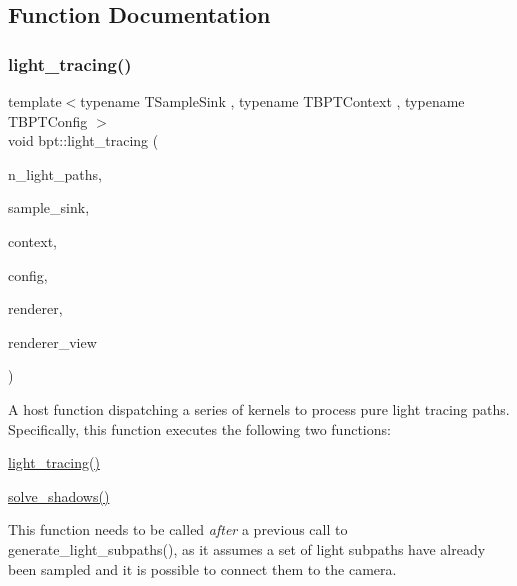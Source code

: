 \subsection{Function Documentation}
\mbox{\label{group___b_p_t_lib_ga497e0940986e5f948a9dcf42242d39c7}} 
\subsubsection{\texorpdfstring{light\+\_\+tracing()}{light\_tracing()}}
{\footnotesize\ttfamily template$<$typename T\+Sample\+Sink , typename T\+B\+P\+T\+Context , typename T\+B\+P\+T\+Config $>$ \\
void bpt\+::light\+\_\+tracing (\begin{DoxyParamCaption}\item[{const uint32}]{n\+\_\+light\+\_\+paths,  }\item[{T\+Sample\+Sink}]{sample\+\_\+sink,  }\item[{T\+B\+P\+T\+Context \&}]{context,  }\item[{const T\+B\+P\+T\+Config \&}]{config,  }\item[{\hyperlink{struct_rendering_context}{Rendering\+Context} \&}]{renderer,  }\item[{\hyperlink{struct_rendering_context_view}{Rendering\+Context\+View} \&}]{renderer\+\_\+view }\end{DoxyParamCaption})}

\begin{DoxyParagraph}{}
A host function dispatching a series of kernels to process pure light tracing paths. Specifically, this function executes the following two functions\+: ~\newline

\begin{DoxyItemize}
\item \hyperlink{group___b_p_t_lib_ga497e0940986e5f948a9dcf42242d39c7}{light\+\_\+tracing()}
\item \hyperlink{group___b_p_t_lib_ga67c2c1dbc4ee8212daf3728fafe55969}{solve\+\_\+shadows()} 
\end{DoxyItemize}
\end{DoxyParagraph}
\begin{DoxyParagraph}{}
This function needs to be called {\itshape after} a previous call to generate\+\_\+light\+\_\+subpaths(), as it assumes a set of light subpaths have already been sampled and it is possible to connect them to the camera.
\end{DoxyParagraph}

